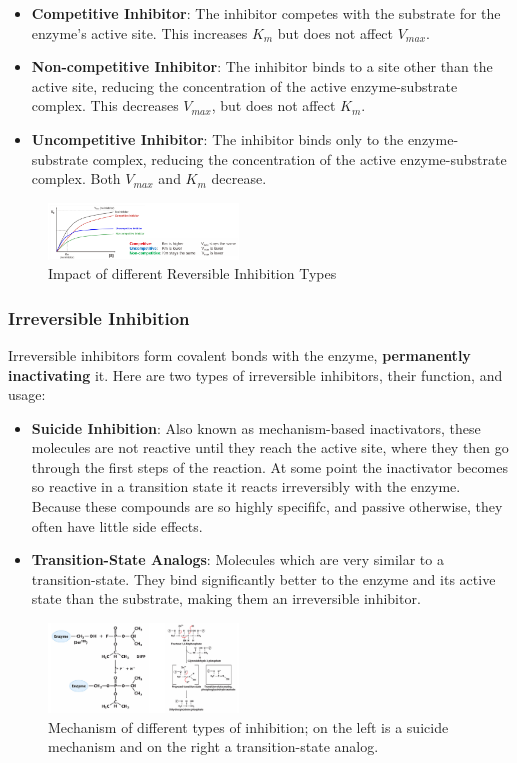 \documentclass[../main.tex]{subfiles}
\begin{document}
\begin{itemize}
	\item \textbf{\gls{Competitive Inhibitor}}: The inhibitor competes with the substrate for the enzyme's active site. This increases $K_{m}$ but does not affect $V_{max}$.
	\item \textbf{\gls{Non-competitive Inhibitor}}: The inhibitor binds to a site other than the active site, reducing the concentration of the active enzyme-substrate complex. This decreases $V_{max}$, but does not affect $K_{m}$.
	\item\textbf{\gls{Uncompetitive Inhibitor}}: The inhibitor binds only to the enzyme-substrate complex, reducing the concentration of the active enzyme-substrate complex. Both $V_{max}$ and $K_{m}$ decrease.
\end{itemize}

\begin{figure}[h]
	\centering
	\includegraphics[width=0.45\textwidth]{reversible_MM}
	\caption{Impact of different Reversible Inhibition Types}
\end{figure}


\subsubsection{\gls{Irreversible Inhibition}}
Irreversible inhibitors form covalent bonds with the enzyme, \textbf{permanently inactivating} it.
Here are two types of irreversible inhibitors, their function, and usage:
\begin{itemize}
	\item \textbf{\gls{Suicide Inhibition}}: Also known as mechanism-based inactivators, these molecules are not reactive until they reach the active site, where they then go through the first steps of the reaction. At some point the inactivator becomes so reactive in a transition state it reacts irreversibly with the enzyme. Because these compounds are so highly specififc, and passive otherwise, they often have little side effects.
	\item \textbf{\gls{Transition-State Analogs}}: Molecules which are very similar to a transition-state. They bind significantly better to the enzyme and its active state than the substrate, making them an irreversible inhibitor.
\end{itemize}

\begin{figure}[h]
	\centering
	\includegraphics[width=0.45\textwidth]{Irreversible}
	\caption{Mechanism of different types of inhibition; on the left is a suicide mechanism and on the right a transition-state analog.}
\end{figure}
\end{document}
